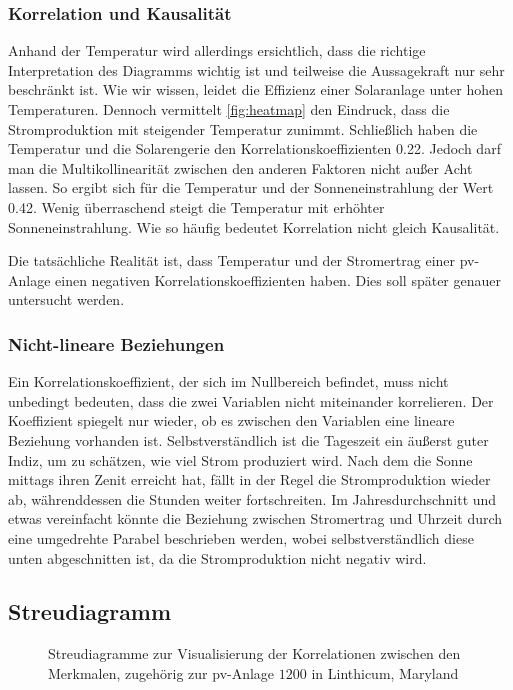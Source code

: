 \documentclass[12pt, a4paper]{article}
\begin{document}
\subsubsection{Korrelation und Kausalität}

Anhand der Temperatur wird allerdings ersichtlich, dass die richtige Interpretation des Diagramms wichtig ist und teilweise die Aussagekraft nur sehr beschränkt ist. Wie wir wissen, leidet die Effizienz einer Solaranlage unter hohen Temperaturen. Dennoch vermittelt \autoref{fig:heatmap} den Eindruck, dass die Stromproduktion mit steigender Temperatur zunimmt. Schließlich haben die Temperatur und die Solarengerie den Korrelationskoeffizienten 0.22. Jedoch darf man die Multikollinearität zwischen den anderen Faktoren nicht außer Acht lassen. So ergibt sich für die Temperatur und der Sonneneinstrahlung der Wert 0.42. Wenig überraschend steigt die Temperatur mit erhöhter Sonneneinstrahlung. Wie so häufig bedeutet Korrelation nicht gleich Kausalität. 

Die tatsächliche Realität ist, dass Temperatur und der Stromertrag einer \ac{pv}-Anlage einen negativen Korrelationskoeffizienten haben. Dies soll später genauer untersucht werden.

\subsubsection{Nicht-lineare Beziehungen}

Ein Korrelationskoeffizient, der sich im Nullbereich befindet, muss nicht unbedingt bedeuten, dass die zwei Variablen nicht miteinander korrelieren. Der Koeffizient spiegelt nur wieder, ob es zwischen den Variablen eine lineare Beziehung vorhanden ist. Selbstverständlich ist die Tageszeit ein äußerst guter Indiz, um zu schätzen, wie viel Strom produziert wird. Nach dem die Sonne mittags ihren Zenit erreicht hat, fällt in der Regel die Stromproduktion wieder ab, währenddessen die Stunden weiter fortschreiten. Im Jahresdurchschnitt und etwas vereinfacht könnte die Beziehung zwischen Stromertrag und Uhrzeit durch eine umgedrehte Parabel beschrieben werden, wobei selbstverständlich diese unten abgeschnitten ist, da die Stromproduktion nicht negativ wird.


\subsection{Streudiagramm}

\begin{figure}
\centering
\def\svgwidth{450pt}

\caption{Streudiagramme zur Visualisierung der Korrelationen zwischen den Merkmalen, zugehörig zur \ac{pv}-Anlage $1200$ in Linthicum, Maryland}
\label{fig:pairplot_all}
\end {figure}
\end{document}
